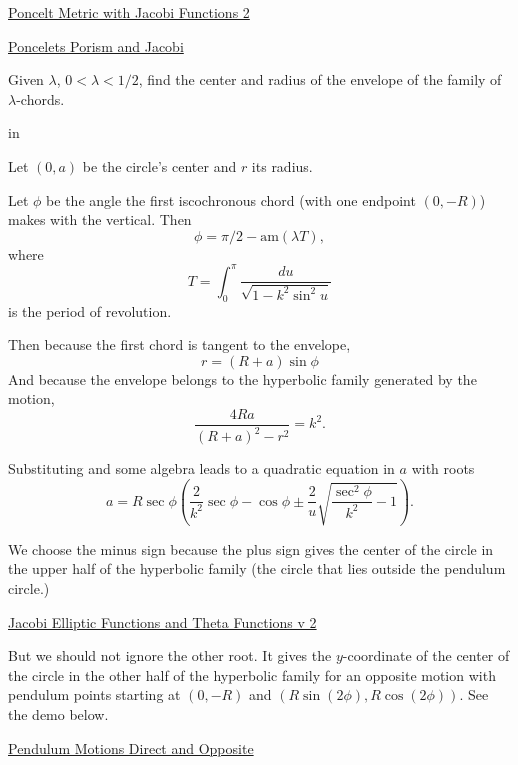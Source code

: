 \documentclass{ximera}
\newcommand{\pskip}{\vskip 0.1 in}
\begin{document}
\href{https://www.desmos.com/calculator/hm5zop04ob}{Poncelt Metric with Jacobi Functions 2}



\begin{onlineOnly}
    \begin{center}
\end{center}
\end{onlineOnly}

\href{https://www.desmos.com/calculator/lwbypn9rje}{Poncelets Porism and Jacobi}



\begin{exploration}

Given $\lambda$, $0 < \lambda < 1/2$, find the center and radius of the envelope of the family of $\lambda$-chords. 

\pskip

Let $(0,a)$ be the circle's center and $r$ its radius.

Let $\phi$ be the angle the first iscochronous chord (with one endpoint $(0,-R)$) makes with the vertical. Then
\[
      \phi = \pi/2 - \text{am}(\lambda T) ,
\]
where
\[
  T = \int_0^{\pi} \frac{du}{\sqrt{1-k^2\sin^2 u}}
\] 
is the period of revolution.

Then because the first chord is tangent to the envelope,
\[
     r = (R+a) \sin \phi
\]
And because the envelope belongs to the hyperbolic family generated by the motion,
\[
  \frac{4Ra}{(R+a)^2 - r^2} = k^2 .
\]

Substituting and some algebra leads to a quadratic equation in $a$ with roots
\[
  a =   R \sec \phi \left( \frac{2}{k^2} \sec \phi - \cos\phi \pm   \frac{2}{u} \sqrt{\frac{\sec^2\phi}{k^2} - 1}   \right) .
\]

We choose the minus sign because the plus sign gives the center of the circle in the upper half of the hyperbolic family (the circle that lies outside the pendulum circle.)



\begin{onlineOnly}
    \begin{center}
\end{center}
\end{onlineOnly}

\href{https://www.desmos.com/calculator/svb8pwijet}{Jacobi Elliptic Functions and Theta Functions v 2}

But we should not ignore the other root. It gives the $y$-coordinate of the center of the circle in the other half of the hyperbolic family for an opposite motion with pendulum points starting at $(0,-R)$ and $(R\sin(2\phi),R\cos(2\phi))$. See the demo below.

\begin{onlineOnly}
    \begin{center}
\end{center}
\end{onlineOnly}

\href{https://www.desmos.com/calculator/swzgtt3nup}{Pendulum Motions Direct and Opposite}


\end{exploration}
\end{document}
